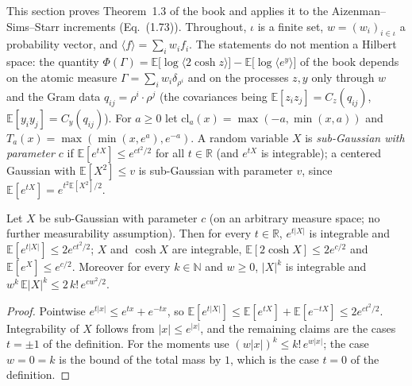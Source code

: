 This section proves Theorem~1.3 of the book and applies it to the Aizenman--Sims--Starr increments (Eq.~(1.73)). Throughout, $\iota$ is a finite set,
$w=(w_i)_{i\in\iota}$ a probability vector, and $\langle f\rangle=\sum_iw_if_i$. The statements do not mention a Hilbert space: the quantity
$\Phi(\Gamma)=\mathbb E\big[\log\langle2\cosh z\rangle\big]-\mathbb E\big[\log\langle e^{y}\rangle\big]$ of the book depends on the atomic measure
$\Gamma=\sum_iw_i\delta_{\rho^i}$ and on the processes $z,y$ only through $w$ and the Gram data $q_{ij}=\rho^i\cdot\rho^j$ (the covariances being
$\mathbb E[z_iz_j]=C_z(q_{ij})$, $\mathbb E[y_iy_j]=C_y(q_{ij})$). For $a\ge0$ let $\mathrm{cl}_a(x)=\max(-a,\min(x,a))$ and
$T_a(x)=\max(\min(x,e^a),e^{-a})$. A random variable $X$ is \emph{sub-Gaussian with parameter $c$} if $\mathbb E[e^{tX}]\le e^{ct^2/2}$ for all $t\in\mathbb R$
(and $e^{tX}$ is integrable); a centered Gaussian with $\mathbb E[X^2]\le v$ is sub-Gaussian with parameter $v$, since $\mathbb E[e^{tX}]=e^{t^2\mathbb E[X^2]/2}$.

\begin{lemma}\label{lem:sg:absmoment}
  \leanok
Let $X$ be sub-Gaussian with parameter $c$ (on an arbitrary measure space; no further measurability assumption). Then for every $t\in\mathbb R$, $e^{t|X|}$ is integrable and $\mathbb E[e^{t|X|}]\le2e^{ct^2/2}$; $X$ and
$\cosh X$ are integrable, $\mathbb E[2\cosh X]\le2e^{c/2}$ and $\mathbb E[e^{X}]\le e^{c/2}$. Moreover for every $k\in\mathbb N$ and $w\ge0$,
$|X|^k$ is integrable and $w^k\,\mathbb E|X|^k\le 2\,k!\,e^{cw^2/2}$.
\end{lemma}

\begin{proof}
  \leanok
Pointwise $e^{t|x|}\le e^{tx}+e^{-tx}$, so $\mathbb E[e^{t|X|}]\le\mathbb E[e^{tX}]+\mathbb E[e^{-tX}]\le2e^{ct^2/2}$. Integrability of $X$ follows from $|x|\le e^{|x|}$,
and the remaining claims are the cases $t=\pm1$ of the definition. For the moments use
$(w|x|)^k\le k!\,e^{w|x|}$; the case $w=0=k$ is the bound of the total mass by $1$, which is the case $t=0$ of the definition.
\end{proof}

